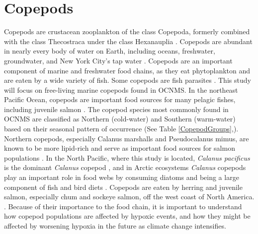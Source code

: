 \documentclass[12pt,twoside]{reedthesis}
\begin{document}
\section{Copepods}

Copepods are crustacean zooplankton of the class Copepoda, formerly combined with the class Thecostraca under the class Hexanauplia \autocite{Oakley2013, Lozano-Fernandez2019}. Copepods are abundant in nearly every body of water on Earth, including oceans, freshwater, groundwater, and New York City's tap water \autocite{Vakati2023, Berger2004}. Copepods are an important component of marine and freshwater food chains, as they eat phytoplankton and are eaten by a wide variety of fish. Some copepods are fish parasites \autocite{Vakati2023}. This study will focus on free-living marine copepods found in OCNMS. In the northeast Pacific Ocean, copepods are important food sources for many pelagic fishes, including juvenile salmon \autocite{Brodeur1990}. The copepod species most commonly found in OCNMS are classified as Northern (cold-water) and Southern (warm-water) based on their seasonal pattern of occurrence (See Table \ref{CopepodGroups},\autocite{Fisheries2024, Peterson2003, Peterson1977}).  Northern copepods, especially Calanus marshalls and Pseudocalanus mimus, are known to be more lipid-rich and serve as important food sources for salmon populations \autocite{Fisheries2024}. In the North Pacific, where this study is located, \textit{Calanus pacificus} is the dominant \textit{Calanus} copepod \autocite{Star1981}, and in Arctic ecosystems \textit{Calanus} copepods play an important role in food webs by consuming diatoms and being a large component of fish and bird diets \autocite{Falk-Petersen2007}. Copepods are eaten by herring and juvenile salmon, especially chum and sockeye salmon, off the west coast of North America. \autocite{Brodeur1990, Friedenberg2012}. Because of their importance to the food chain, it is important to understand how copepod populations are affected by hypoxic events, and how they might be affected by worsening hypoxia in the future as climate change intensifies. 
\end{document}
